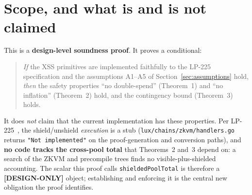 \documentclass[11pt]{article}
\theoremstyle{definition}
\theoremstyle{remark}
\newcommand{\DESIGN}{\textbf{[DESIGN-ONLY]}}
\begin{document}
\tableofcontents
\newpage

\section{Scope, and what is and is not claimed}
\label{sec:scope}

This is a \textbf{design-level soundness proof}. It proves a conditional:
\begin{quote}
\emph{If} the XSS primitives are implemented faithfully to the LP-225
specification and the assumptions A1--A5 of Section~\ref{sec:assumptions}
hold, \emph{then} the safety properties ``no double-spend'' (Theorem~1)
and ``no inflation'' (Theorem~2) hold, and the contingency bound
(Theorem~3) holds.
\end{quote}
It does \emph{not} claim that the current implementation has these
properties. Per LP-225~\cite{lp225}, the shield/unshield \emph{execution}
is a stub (\texttt{lux/chains/zkvm/handlers.go} returns
\texttt{"Not implemented"} on the proof-generation and conversion paths),
and \textbf{no code tracks the cross-pool total} that Theorems~2 and~3
depend on: a search of the ZKVM and precompile trees finds no
visible-plus-shielded accounting. The scalar this proof calls
\texttt{shieldedPoolTotal} is therefore a \DESIGN{} object; establishing
and enforcing it is the central new obligation the proof identifies.
\end{document}

